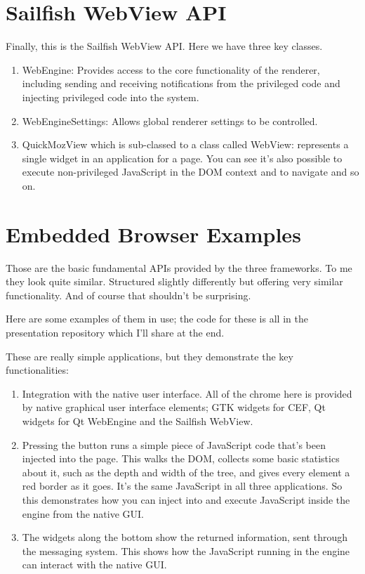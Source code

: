 \documentclass{article}
\begin{document}

\section{Sailfish WebView API}

Finally, this is the Sailfish WebView API. Here we have three key classes.

\begin{enumerate}
\item {\code WebEngine}: Provides access to the core functionality of the renderer, including sending and receiving notifications from the privileged code and injecting privileged code into the system.
\item {\code WebEngineSettings}: Allows global renderer settings to be controlled.
\item {\code QuickMozView} which is sub-classed to a class called {\code WebView}: represents a single widget in an application for a page. You can see it's also possible to execute non-privileged JavaScript in the DOM context and to navigate and so on.
\end{enumerate}


\section{Embedded Browser Examples}

Those are the basic fundamental APIs provided by the three frameworks. To me they look quite similar. Structured slightly differently but offering very similar functionality. And of course that shouldn't be surprising.

Here are some examples of them in use; the code for these is all in the presentation repository which I'll share at the end. 

These are really simple applications, but they demonstrate the key functionalities:
\begin{enumerate}
\item Integration with the native user interface. All of the chrome here is provided by native graphical user interface elements; GTK widgets for CEF, Qt widgets for Qt WebEngine and the Sailfish WebView.
\item Pressing the button runs a simple piece of JavaScript code that's been injected into the page. This walks the DOM, collects some basic statistics about it, such as the depth and width of the tree, and gives every element a red border as it goes. It's the same JavaScript in all three applications. So this demonstrates how you can inject into and execute JavaScript inside the engine from the native GUI.
\item The widgets along the bottom show the returned information, sent through the messaging system. This shows how the JavaScript running in the engine can interact with the native GUI. 
\end{enumerate}
\end{document}
